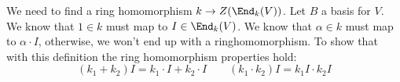 We need to find a ring homomorphism $k \to Z(\End_k(V))$. Let $B$ a basis for $V$. We know that $1\in k$ must map to $I \in \End_k(V)$. We know that $\alpha \in k$ must map to $\alpha \cdot I$, otherwise, we won't end up with a ringhomomorphism. To show that with this definition the ring homomorphism properties hold:
\[(k_1+k_2) I=k_1\cdot I + k_2 \cdot I \quad \quad (k_1 \cdot k_2)I= k_1 I \cdot k_2 I  \]